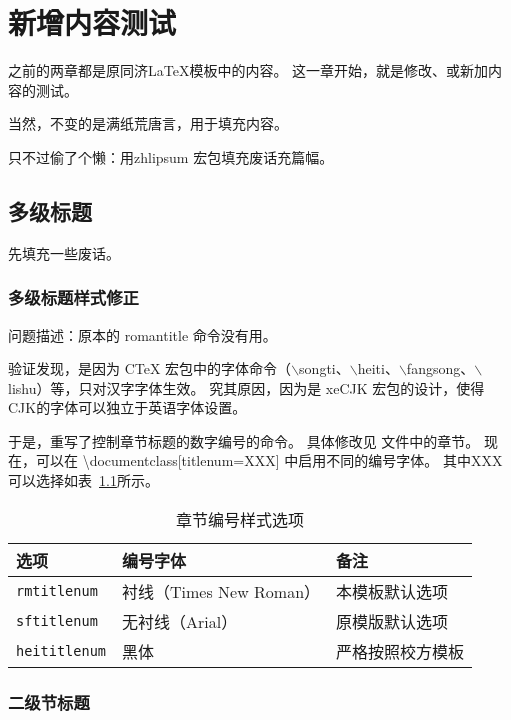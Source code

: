 \documentclass[../Main/thesis]{subfiles}
\begin{document}
\chapter{新增内容测试}
\label{cha:new}

之前的两章都是原同济LaTeX模板中的内容。
这一章开始，就是修改、或新加内容的测试\cite{mohrssBIM}。

当然，不变的是满纸荒唐言，用于填充内容\cite{HowDigital}。

只不过偷了个懒：用\textsf{zhlipsum} 宏包填充废话充篇幅。

\section{多级标题} \label{sec:seclv}

先填充一些废话。\zhlipsum[4]

\subsection{多级标题样式修正}
\label{ssc:titles-style}

问题描述：原本的 \textsf{romantitle} 命令没有用。

验证发现，是因为 \textsf{CTeX} 宏包中的字体命令（\textsf{$\backslash$songti}、\textsf{$\backslash$heiti}、\textsf{$\backslash$fangsong}、\textsf{$\backslash$lishu}）等，只对汉字字体生效。
究其原因，因为是 \textsf{xeCJK} 宏包的设计，使得CJK的字体可以独立于英语字体设置。

于是，重写了控制章节标题的数字编号的命令。
具体修改见  文件中的章节。
现在，可以在 \textbackslash documentclass[titlenum=XXX] 中启用不同的编号字体。
其中XXX可以选择如表~\ref{tab:title-number-format}所示。

\begin{table}[htbp]
\centering
\caption{\tongjithesis 章节编号样式选项}
\label{tab:title-number-format}
\begin{tabular}[c]{lll}
  \toprule[1.5pt]
  选项 & 编号字体 & 备注 \\ %
  \midrule[1pt]
  \texttt{rmtitlenum} & 衬线（Times New Roman） & 本模板默认选项 \\
  \texttt{sftitlenum} & 无衬线（Arial） & 原模版默认选项 \\
  \texttt{heititlenum} & 黑体 & 严格按照校方模板 \\
  \bottomrule[1.5pt]
\end{tabular}
\end{table}

\subsection{二级节标题} \label{ssc:subsec2}
\end{document}

